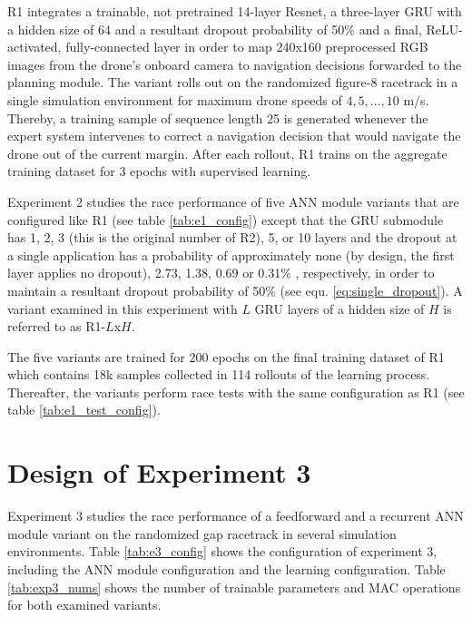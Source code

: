 R1 integrates
a trainable, not pretrained 14-layer Resnet, 
a three-layer GRU with a hidden size of 64
and a resultant dropout probability of 50\%
and a final, ReLU-activated, fully-connected layer 
in order to map 240x160 preprocessed RGB images
from the drone's onboard camera
to navigation decisions forwarded to the planning module.
The variant rolls out on the randomized figure-8 racetrack
in a single simulation environment
for maximum drone speeds of $4,5,\dots,10$ m/s.
Thereby, a training sample of sequence length 25 
is generated whenever the expert system intervenes
to correct a navigation decision that would navigate
the drone out of the current margin.
After each rollout, R1 trains on
the aggregate training dataset 
for 3 epochs with supervised learning.



Experiment 2 studies the race performance
of five ANN module variants
that are configured like R1
(see table \ref{tab:e1_config})
except that the GRU submodule has
1, 2, 3 (this is the original number of R2), 5, or 10 layers
and the dropout at a single application
has a probability of approximately
none (by design, the first layer applies no dropout), 
2.73, 1.38, 0.69 or 0.31\%
, respectively,
in order to maintain
a resultant dropout probability of 50\%
(see equ. \ref{eq:single_dropout}).
A variant examined in this experiment 
with $L$ GRU layers
of a hidden size of $H$
is referred to as R1-$L$x$H$.

The five variants are trained for
200 epochs on 
the final training dataset of R1
which contains 18k samples collected in 114 rollouts
of the learning process.
Thereafter, the variants perform
race tests with the same
configuration as R1 (see table \ref{tab:e1_test_config}).





\section{Design of Experiment 3}
Experiment 3 studies the race performance of a
feedforward and a recurrent ANN module variant
on the randomized gap racetrack in several
simulation environments.
Table \ref{tab:e3_config} shows the configuration of experiment 3,
including the ANN module configuration
and the learning configuration.
Table \ref{tab:exp3_nums} shows the number of trainable parameters
and MAC operations for both examined variants.

